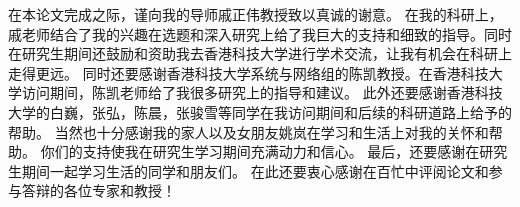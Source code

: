 \begin{thanks}

在本论文完成之际，谨向我的导师戚正伟教授致以真诚的谢意。
在我的科研上，戚老师结合了我的兴趣在选题和深入研究上给了我巨大的支持和细致的指导。同时在研究生期间还鼓励和资助我去香港科技大学进行学术交流，让我有机会在科研上走得更远。
同时还要感谢香港科技大学系统与网络组的陈凯教授。在香港科技大学访问期间，陈凯老师给了我很多研究上的指导和建议。
此外还要感谢香港科技大学的白巍，张弘，陈晨，张骏雪等同学在我访问期间和后续的科研道路上给予的帮助。
当然也十分感谢我的家人以及女朋友姚岚在学习和生活上对我的关怀和帮助。
你们的支持使我在研究生学习期间充满动力和信心。
最后，还要感谢在研究生期间一起学习生活的同学和朋友们。
在此还要衷心感谢在百忙中评阅论文和参与答辩的各位专家和教授！

\end{thanks}
